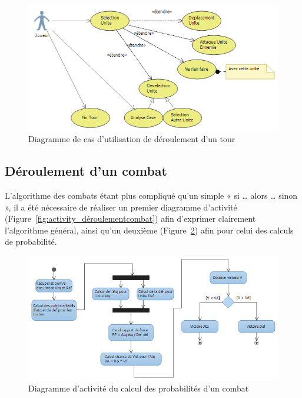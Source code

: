 \documentclass[a4paper]{article}%
\begin{document}
\begin{figure}[H]
   \centering
   \includegraphics[width=\textwidth]{./images/use_case/DiagUseCaseTour.png}
                \caption{Diagramme de cas d'utilisation de déroulement d'un tour}
                \label{fig:use_case_déroulementtour}
\end{figure}

\newpage

\subsection{Déroulement d'un combat}
L'algorithme des combats étant plus compliqué qu'un simple « si … alors … sinon », il a été nécessaire de réaliser un premier diagramme d'activité (Figure~\ref{fig:activity_déroulementcombat}) afin d'exprimer clairement l'algorithme général, ainsi qu'un deuxième (Figure~\ref{fig:activity_probabilitéscombat}) afin pour celui des calculs de probabilité.

\begin{figure}[H]
    \centering
    \includegraphics[width=\textwidth]{./images/activity/DiagActivityCombat2.png}
                \caption{Diagramme d'activité du calcul des probabilités d'un combat}
                \label{fig:activity_probabilitéscombat}
\end{figure}
\end{document}
